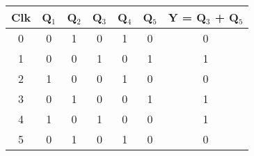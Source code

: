 \begin{tabular}{|c|c|c|c|c|c|c|}
\hline
\textbf{Clk}             & \textbf{Q$_1$} & \textbf{Q$_2$} & \textbf{Q$_3$} & \textbf{Q$_4$} & \textbf{Q$_5$} & \textbf{Y = Q$_3$ + Q$_5$} \\ \hline
{\color[HTML]{6200C9} 0} & 0              & 1              & 0              & 1              & 0              & 0                          \\
{\color[HTML]{6200C9} 1} & 0              & 0              & 1              & 0              & 1              & 1                          \\
{\color[HTML]{6200C9} 2} & 1              & 0              & 0              & 1              & 0              & 0                          \\
{\color[HTML]{6200C9} 3} & 0              & 1              & 0              & 0              & 1              & 1                          \\
{\color[HTML]{6200C9} 4} & 1              & 0              & 1              & 0              & 0              & 1                          \\
{\color[HTML]{6200C9} 5} & 0              & 1              & 0              & 1              & 0              & 0                          \\ \hline
\end{tabular}